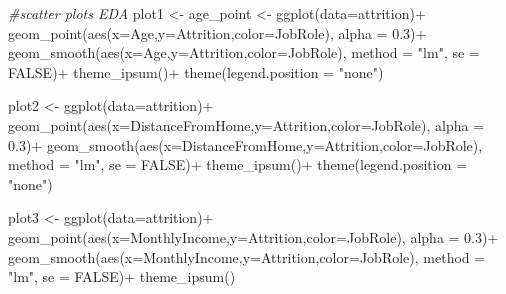 \documentclass[
]{article}
\newenvironment{Shaded}{\begin{snugshade}}{\end{snugshade}}
\newcommand{\AttributeTok}[1]{\textcolor[rgb]{0.77,0.63,0.00}{#1}}
\newcommand{\CommentTok}[1]{\textcolor[rgb]{0.56,0.35,0.01}{\textit{#1}}}
\newcommand{\ConstantTok}[1]{\textcolor[rgb]{0.00,0.00,0.00}{#1}}
\newcommand{\FloatTok}[1]{\textcolor[rgb]{0.00,0.00,0.81}{#1}}
\newcommand{\FunctionTok}[1]{\textcolor[rgb]{0.00,0.00,0.00}{#1}}
\newcommand{\NormalTok}[1]{#1}
\newcommand{\OtherTok}[1]{\textcolor[rgb]{0.56,0.35,0.01}{#1}}
\newcommand{\SpecialCharTok}[1]{\textcolor[rgb]{0.00,0.00,0.00}{#1}}
\newcommand{\StringTok}[1]{\textcolor[rgb]{0.31,0.60,0.02}{#1}}
\begin{document}
\begin{Shaded}
\begin{Highlighting}[]
\CommentTok{\#scatter plots EDA}
\NormalTok{plot1 }\OtherTok{\textless{}{-}}\NormalTok{ age\_point }\OtherTok{\textless{}{-}} \FunctionTok{ggplot}\NormalTok{(}\AttributeTok{data=}\NormalTok{attrition)}\SpecialCharTok{+}
  \FunctionTok{geom\_point}\NormalTok{(}\FunctionTok{aes}\NormalTok{(}\AttributeTok{x=}\NormalTok{Age,}\AttributeTok{y=}\NormalTok{Attrition,}\AttributeTok{color=}\NormalTok{JobRole), }\AttributeTok{alpha =} \FloatTok{0.3}\NormalTok{)}\SpecialCharTok{+}
  \FunctionTok{geom\_smooth}\NormalTok{(}\FunctionTok{aes}\NormalTok{(}\AttributeTok{x=}\NormalTok{Age,}\AttributeTok{y=}\NormalTok{Attrition,}\AttributeTok{color=}\NormalTok{JobRole), }\AttributeTok{method =} \StringTok{"lm"}\NormalTok{, }\AttributeTok{se =} \ConstantTok{FALSE}\NormalTok{)}\SpecialCharTok{+}
  \FunctionTok{theme\_ipsum}\NormalTok{()}\SpecialCharTok{+}
  \FunctionTok{theme}\NormalTok{(}\AttributeTok{legend.position =} \StringTok{"none"}\NormalTok{)}

\NormalTok{plot2 }\OtherTok{\textless{}{-}} \FunctionTok{ggplot}\NormalTok{(}\AttributeTok{data=}\NormalTok{attrition)}\SpecialCharTok{+}
  \FunctionTok{geom\_point}\NormalTok{(}\FunctionTok{aes}\NormalTok{(}\AttributeTok{x=}\NormalTok{DistanceFromHome,}\AttributeTok{y=}\NormalTok{Attrition,}\AttributeTok{color=}\NormalTok{JobRole), }\AttributeTok{alpha =} \FloatTok{0.3}\NormalTok{)}\SpecialCharTok{+}
  \FunctionTok{geom\_smooth}\NormalTok{(}\FunctionTok{aes}\NormalTok{(}\AttributeTok{x=}\NormalTok{DistanceFromHome,}\AttributeTok{y=}\NormalTok{Attrition,}\AttributeTok{color=}\NormalTok{JobRole), }\AttributeTok{method =} \StringTok{"lm"}\NormalTok{, }\AttributeTok{se =} \ConstantTok{FALSE}\NormalTok{)}\SpecialCharTok{+}
  \FunctionTok{theme\_ipsum}\NormalTok{()}\SpecialCharTok{+}
  \FunctionTok{theme}\NormalTok{(}\AttributeTok{legend.position =} \StringTok{"none"}\NormalTok{)}

\NormalTok{plot3 }\OtherTok{\textless{}{-}} \FunctionTok{ggplot}\NormalTok{(}\AttributeTok{data=}\NormalTok{attrition)}\SpecialCharTok{+}
  \FunctionTok{geom\_point}\NormalTok{(}\FunctionTok{aes}\NormalTok{(}\AttributeTok{x=}\NormalTok{MonthlyIncome,}\AttributeTok{y=}\NormalTok{Attrition,}\AttributeTok{color=}\NormalTok{JobRole), }\AttributeTok{alpha =} \FloatTok{0.3}\NormalTok{)}\SpecialCharTok{+}
  \FunctionTok{geom\_smooth}\NormalTok{(}\FunctionTok{aes}\NormalTok{(}\AttributeTok{x=}\NormalTok{MonthlyIncome,}\AttributeTok{y=}\NormalTok{Attrition,}\AttributeTok{color=}\NormalTok{JobRole), }\AttributeTok{method =} \StringTok{"lm"}\NormalTok{, }\AttributeTok{se =} \ConstantTok{FALSE}\NormalTok{)}\SpecialCharTok{+}
  \FunctionTok{theme\_ipsum}\NormalTok{()}


\end{Highlighting}
\end{Shaded}
\end{document}
